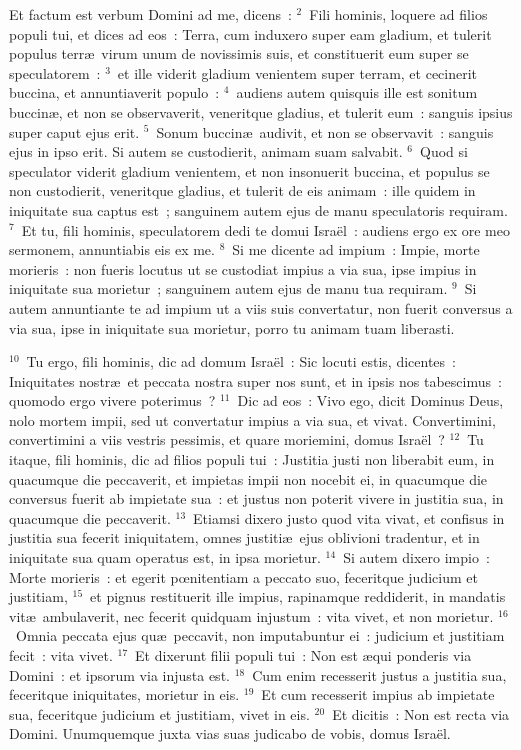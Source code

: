 \lettrine[lines=10,image=true,loversize=0.05,lraise=-0.03]{E}{}t factum est verbum Domini ad me, dicens~:
${}^{2}$~Fili hominis, loquere ad filios populi tui, et dices ad eos~: Terra, cum induxero super eam gladium, et tulerit populus terr\ae\ virum unum de novissimis suis, et constituerit eum super se speculatorem~:
${}^{3}$~et ille viderit gladium venientem super terram, et cecinerit buccina, et annuntiaverit populo~:
${}^{4}$~audiens autem quisquis ille est sonitum buccin\ae , et non se observaverit, veneritque gladius, et tulerit eum~: sanguis ipsius super caput ejus erit.
${}^{5}$~Sonum buccin\ae\ audivit, et non se observavit~: sanguis ejus in ipso erit. Si autem se custodierit, animam suam salvabit.
${}^{6}$~Quod si speculator viderit gladium venientem, et non insonuerit buccina, et populus se non custodierit, veneritque gladius, et tulerit de eis animam~: ille quidem in iniquitate sua captus est~; sanguinem autem ejus de manu speculatoris requiram.
${}^{7}$~Et tu, fili hominis, speculatorem dedi te domui Isra\"el~: audiens ergo ex ore meo sermonem, annuntiabis eis ex me.
${}^{8}$~Si me dicente ad impium~: Impie, morte morieris~: non fueris locutus ut se custodiat impius a via sua, ipse impius in iniquitate sua morietur~; sanguinem autem ejus de manu tua requiram.
${}^{9}$~Si autem annuntiante te ad impium ut a viis suis convertatur, non fuerit conversus a via sua, ipse in iniquitate sua morietur, porro tu animam tuam liberasti.


${}^{10}$~Tu ergo, fili hominis, dic ad domum Isra\"el~: Sic locuti estis, dicentes~: Iniquitates nostr\ae\ et peccata nostra super nos sunt, et in ipsis nos tabescimus~: quomodo ergo vivere poterimus~?
${}^{11}$~Dic ad eos~: Vivo ego, dicit Dominus Deus, nolo mortem impii, sed ut convertatur impius a via sua, et vivat. Convertimini, convertimini a viis vestris pessimis, et quare moriemini, domus Isra\"el~?
${}^{12}$~Tu itaque, fili hominis, dic ad filios populi tui~: Justitia justi non liberabit eum, in quacumque die peccaverit, et impietas impii non nocebit ei, in quacumque die conversus fuerit ab impietate sua~: et justus non poterit vivere in justitia sua, in quacumque die peccaverit.
${}^{13}$~Etiamsi dixero justo quod vita vivat, et confisus in justitia sua fecerit iniquitatem, omnes justiti\ae\ ejus oblivioni tradentur, et in iniquitate sua quam operatus est, in ipsa morietur.
${}^{14}$~Si autem dixero impio~: Morte morieris~: et egerit pœnitentiam a peccato suo, feceritque judicium et justitiam,
${}^{15}$~et pignus restituerit ille impius, rapinamque reddiderit, in mandatis vit\ae\ ambulaverit, nec fecerit quidquam injustum~: vita vivet, et non morietur.
${}^{16}$~Omnia peccata ejus qu\ae\ peccavit, non imputabuntur ei~: judicium et justitiam fecit~: vita vivet.
${}^{17}$~Et dixerunt filii populi tui~: Non est \ae qui ponderis via Domini~: et ipsorum via injusta est.
${}^{18}$~Cum enim recesserit justus a justitia sua, feceritque iniquitates, morietur in eis.
${}^{19}$~Et cum recesserit impius ab impietate sua, feceritque judicium et justitiam, vivet in eis.
${}^{20}$~Et dicitis~: Non est recta via Domini. Unumquemque juxta vias suas judicabo de vobis, domus Isra\"el.


